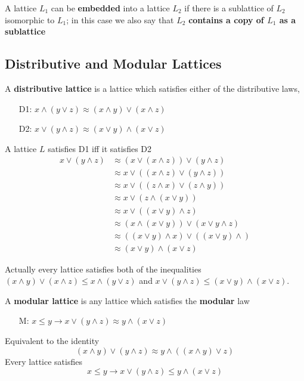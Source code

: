 \documentclass[11pt]{article}
\begin{document}
\begin{definition}[]
A lattice \(L_1\) can be \textbf{embedded} into a lattice \(L_2\) if there is a sublattice
of \(L_2\) isomorphic to \(L_1\); in this case we also say that \(L_2\) 
\textbf{contains a copy of \(L_1\) as a sublattice}
\end{definition}

\subsection{Distributive and Modular Lattices}
\label{sec:org162995c}
\begin{definition}[]
A \textbf{distributive lattice} is a lattice which satisfies either  of the
distributive laws,
\begin{itemize}
\item[D1:] \(x\wedge(y\vee z)\approx(x\wedge y)\vee(x\wedge z)\)
\item[D2:] \(x\vee(y\wedge z)\approx(x\vee y)\wedge(x\vee z)\)
\end{itemize}
\end{definition}

\begin{theorem}[]
A lattice \(L\) satisfies D1 iff it satisfies D2
\begin{align*}
x\vee(y\wedge z)&\approx(x\vee(x\wedge z))\vee(y\wedge z)\tag*{(by L4(a))}\\
&\approx x\vee((x\wedge z)\vee(y\wedge z))\\
&\approx x\vee((z\wedge x)\vee(z\wedge y))\\
&\approx x\vee(z\wedge(x\vee y))\\
&\approx x\vee((x\vee y)\wedge z)\\
&\approx (x\wedge(x\vee y))\vee(x\vee y\wedge z)\\
&\approx ((x\vee y)\wedge x)\vee((x\vee y)\wedge)\\
&\approx (x\vee y)\wedge(x\vee z)
\end{align*}
\end{theorem}

Actually every lattice satisfies both of the inequalities
\((x\wedge y)\vee(x\wedge z)\le x\wedge(y\vee z)\) and
\(x\vee(y\wedge z)\le(x\vee y)\wedge(x\vee z)\).

\begin{definition}[]
A \textbf{modular lattice} is any lattice which satisfies the \textbf{modular} law
\begin{itemize}
\item[M:] \(x\le y\to x\vee(y\wedge z)\approx y\wedge(x\vee z)\)
\end{itemize}
\end{definition}
Equivalent to the identity
\begin{equation*}
(x\wedge y)\vee(y\wedge z)\approx y\wedge((x\wedge y)\vee z)
\end{equation*}
Every lattice satisfies
\begin{equation*}
x\le y\to x\vee(y\wedge z)\le y\wedge(x\vee z)
\end{equation*}
\end{document}
